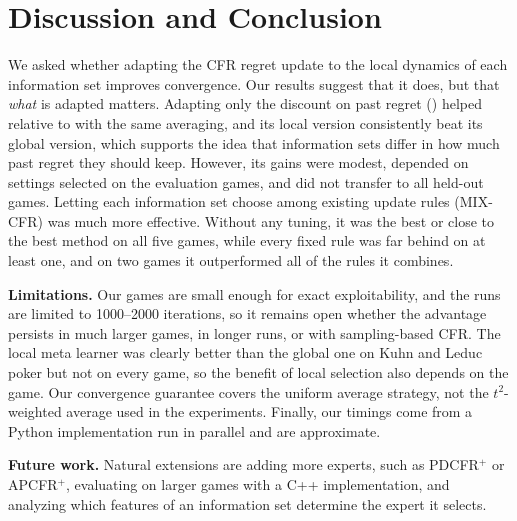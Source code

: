 \section{Discussion and Conclusion}
\label{sec:conclusion}

We asked whether adapting the CFR regret update to the local dynamics of each information set
improves convergence. Our results suggest that it does, but that \emph{what} is adapted
matters. Adapting only the discount on past regret (\ours{}) helped relative to \cfrp{} with the
same averaging, and its local version consistently beat its global version, which supports
the idea that information sets differ in how much past regret they should keep. However, its
gains were modest, depended on settings selected on the evaluation games, and did not
transfer to all held-out games. Letting each information set choose among existing update rules
(MIX-CFR) was much more effective. Without any tuning, it was the best or close to the best
method on all five games, while every fixed rule was far behind on at least one, and on two
games it outperformed all of the rules it combines.

\textbf{Limitations.} Our games are small enough for exact exploitability, and the runs are
limited to 1000--2000 iterations, so it remains open whether the advantage persists in much
larger games, in longer runs, or with sampling-based CFR. The local meta learner was clearly
better than the global one on Kuhn and Leduc poker but not on every game, so the benefit of
local selection also depends on the game. Our convergence guarantee covers the uniform average
strategy, not the $t^2$-weighted average used in the experiments. Finally, our timings come
from a Python implementation run in parallel and are approximate.

\textbf{Future work.} Natural extensions are adding more experts, such as PDCFR$^+$ or
APCFR$^+$, evaluating on larger games with a C++ implementation, and analyzing which features
of an information set determine the expert it selects.
